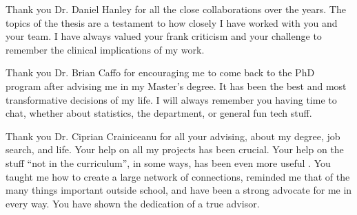 Thank you Dr. Daniel Hanley for all the close collaborations over the years.  The topics of the thesis are a testament to how closely I have worked with you and your team.  I have always valued your frank criticism and your challenge to remember the clinical implications of my work.   

Thank you Dr. Brian Caffo for encouraging me to come back to the PhD program after advising me in my Master's degree. It has been the best and most transformative decisions of my life. I will always remember you having time to chat, whether about statistics, the department, or general fun tech stuff.  

Thank you Dr. Ciprian Crainiceanu for all your advising, about my degree, job search, and life.  Your help on all my projects has been crucial.  Your help on the stuff ``not in the curriculum'', in some ways, has been even more useful .  You taught me how to create a large network of connections, reminded me that of the many things important outside school, and have been a strong advocate for me in every way.   You have shown the dedication of a true advisor. 

